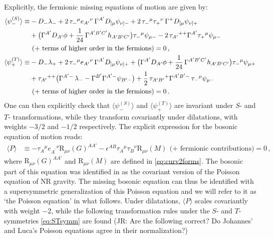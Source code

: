 \documentclass[a4paper,10pt,openany]{article}
\def\rmR{\mathrm{R}}
\newcommand{\JR}[1]{\textcolor{darkergreen}{#1}}
\begin{document}
	Explicitly, the fermionic missing equations of motion are given by:
	\begin{subequations} \label{eq:fermmissingexpl}
		\begin{align}
			\langle \psi^{(S)}_-\rangle  \equiv & -D_-\lambda_- +2\,\tau_-{}^\mu e_{A'}{}^\nu\,\Gamma^{A'}D_{[\mu}\psi_{\nu]-} + 2\,\tau_-{}^\mu\tau_+{}^\nu\,\Gamma^+D_{[\mu}\psi_{\nu]+} \notag\\
			&+ \big(\Gamma^{A'}D_{A'}\phi + \frac{1}{24}\,\Gamma^{A'B'C'}h_{A'B'C'}\big)\tau_-{}^\mu\psi_{\mu-}-2\,\tau_{A'}{}^{++}\Gamma^{A'}\tau_+{}^\mu\psi_{\mu-}  \notag \\ & \  \text{(+ terms of higher order in the fermions)} = 0 \,,\\
			\langle \psi^{(T)}_+\rangle  \equiv  & -D_-\lambda_+ +2\,\tau_-{}^\mu e_{A'}{}^\nu\,\Gamma^{A'}D_{[\mu}\psi_{\nu]+} + \big(\Gamma^{A'}D_{A'}\phi + \frac{1}{24}\,\Gamma^{A'B'C'}h_{A'B'C'}\big)\tau_-{}^\mu\psi_{\mu+}\notag\\
			&+\tau_{A'}{}^{++}\big(\Gamma^{A'-}\,\lambda_- - \Gamma^{B'}\Gamma^{A'-}\psi_{B'-}\big) + \frac12\,\tau_{A'B'}{}^+\Gamma^{A'B'-}\,\tau_-{}^\mu\psi_{\mu -} \notag \\ & \ \text{(+ terms of higher order in the fermions)} = 0\,.
		\end{align}
	\end{subequations}
	One can then explicitly check that $\langle \psi^{(S)}_-\rangle$ and $\langle \psi^{(T)}_+\rangle$ are invariant under $S$- and $T$- transformations, while they transform covariantly under dilatations, with weights $-3/2$ and $-1/2$ respectively. The explicit expression for the bosonic equation of motion reads:
	\begin{align} \label{eq:Poisson}
		\langle P\rangle &
		\equiv -\tau_A{}^\mu e_{A^\prime}{}^\nu \rmR_{\mu\nu}(G)^{AA'} - \epsilon^{AB}\tau_A{}^\mu \tau_B{}^\nu \rmR_{\mu\nu}(M) \ \, \text{(+ fermionic contributions)} = 0\,,
	\end{align}
	where $\rmR_{\mu\nu}(G)^{AA'}$ and $\rmR_{\mu\nu}(M)$ are defined in \eqref{eq:curv2forms}. The bosonic part of this equation was identified in \cite{Bergshoeff:2021bmc} as the covariant version of the Poisson equation of NR gravity. The missing bosonic equation can thus be identified with a supersymmetric generalization of this Poisson equation and we will refer to it as `the Poisson equation' in what follows. Under dilatations, $\langle P \rangle$ scales covariantly with weight $-2$, while the following transformation rules under the $S$- and $T$-symmetries \eqref{eq:STsymm} are found \JR{(JR: Are the following correct? Do Johannes' and Luca's Poisson equations agree in their normalization?)}
\end{document}

